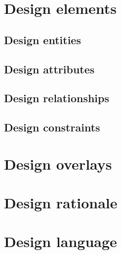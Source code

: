 \documentclass{scrreprt}
\begin{document}
\section{Design elements}

\subsection{Design entities}

\subsection{Design attributes}





\subsection{Design relationships}

\subsection{Design constraints}

\section{Design overlays}

\section{Design rationale}

\section{Design language}
\end{document}
